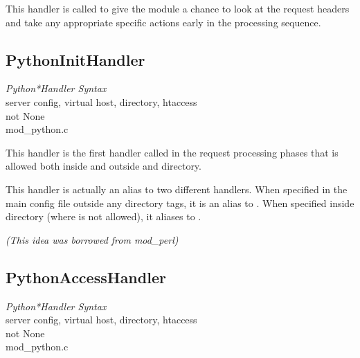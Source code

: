 This handler is called to give the module a chance to look at the
request headers and take any appropriate specific actions early in the
processing sequence.

\subsection{PythonInitHandler\label{dir-handlers-pih}}

\emph{Python*Handler Syntax}\\
server config, virtual host, directory, htaccess\\
not None\\
mod_python.c

This handler is the first handler called in the request processing
phases that is allowed both inside and outside  and
directory.

This handler is actually an alias to two different handlers. When
specified in the main config file outside any directory tags, it is an
alias to . When specified inside directory
(where  is not allowed), it aliases to
.

\emph{(This idea was borrowed from mod_perl)}

\subsection{PythonAccessHandler\label{dir-handlers-ach}}

\emph{Python*Handler Syntax}\\
server config, virtual host, directory, htaccess\\
not None\\
mod_python.c

